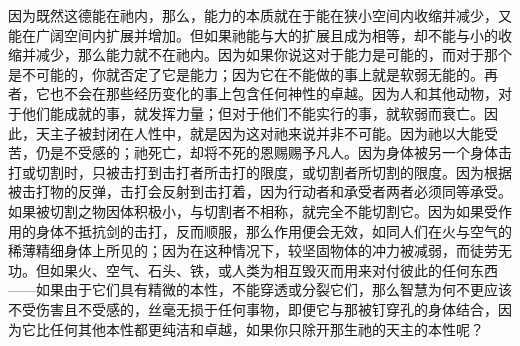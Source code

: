 因为既然这德能在祂内，那么，能力的本质就在于能在狭小空间内收缩并减少，又能在广阔空间内扩展并增加。但如果祂能与大的扩展且成为相等，却不能与小的收缩并减少，那么能力就不在祂内。因为如果你说这对于能力是可能的，而对于那个是不可能的，你就否定了它是能力；因为它在不能做的事上就是软弱无能的。再者，它也不会在那些经历变化的事上包含任何神性的卓越。因为人和其他动物，对于他们能成就的事，就发挥力量；但对于他们不能实行的事，就软弱而衰亡。因此，天主子被封闭在人性中，就是因为这对祂来说并非不可能。因为祂以大能受苦，仍是不受感的；祂死亡，却将不死的恩赐赐予凡人。因为身体被另一个身体击打或切割时，只被击打到击打者所击打的限度，或切割者所切割的限度。因为根据被击打物的反弹，击打会反射到击打着，因为行动者和承受者两者必须同等承受。如果被切割之物因体积极小，与切割者不相称，就完全不能切割它。因为如果受作用的身体不抵抗剑的击打，反而顺服，那么作用便会无效，如同人们在火与空气的稀薄精细身体上所见的；因为在这种情况下，较坚固物体的冲力被减弱，而徒劳无功。但如果火、空气、石头、铁，或人类为相互毁灭而用来对付彼此的任何东西——如果由于它们具有精微的本性，不能穿透或分裂它们，那么智慧为何不更应该不受伤害且不受感的，丝毫无损于任何事物，即便它与那被钉穿孔的身体结合，因为它比任何其他本性都更纯洁和卓越，如果你只除开那生祂的天主的本性呢？\par


